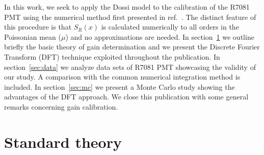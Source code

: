 \documentclass[a4paper,11pt]{article}
\begin{document}
In this work, we seek to apply the Dossi model to the calibration of the R7081 PMT using the numerical method first presented in ref.~\cite{me}. 
The distinct feature of this procedure is that $S_R(x)$ is calculated numerically to all orders in the Poissonian mean ($\mu$) and no approximations are needed. 
In section~\ref{sec:theo} we outline briefly the basic theory of gain determination and we present the Discrete Fourier Transform (DFT) technique exploited throughout the publication. 
In section~\ref{sec:data} we analyze data sets of R7081 PMT showcasing the validity of our study. 
A comparison with the common numerical integration method is included. 
In section~\ref{sec:mc} we present a Monte Carlo study showing the advantages of the DFT approach. 
We close this publication with some general remarks concerning gain calibration. 


\section{Standard theory}
\label{sec:theo}

\end{document}
